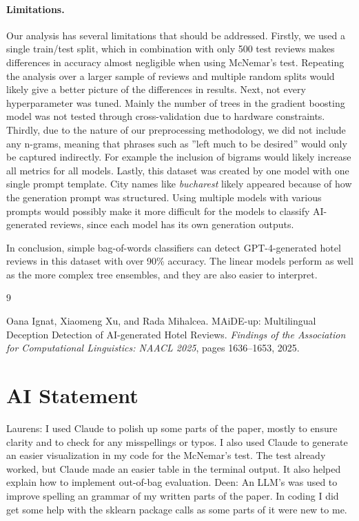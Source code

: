 \documentclass{article}
\begin{document}
\paragraph{Limitations.} 
Our analysis has several limitations that should be addressed. Firstly, we used a single train/test split, which in combination with only 500 test reviews makes differences in accuracy almost negligible when using McNemar's test. Repeating the analysis over a larger sample of reviews and multiple random splits would likely give a better picture of the differences in results. 
Next, not every hyperparameter was tuned. Mainly the number of trees in the gradient boosting model was not tested through cross-validation due to hardware constraints.  
Thirdly, due to the nature of our preprocessing methodology, we did not include any n-grams, meaning that phrases such as ''left much to be desired'' would only be captured indirectly. For example the inclusion of bigrams would likely increase all metrics for all models. 
Lastly, this dataset was created by one model with one single prompt template. City names like \emph{bucharest} likely appeared because of how the generation prompt was structured. Using multiple models with various prompts would possibly make it more difficult for the models to classify AI-generated reviews, since each model has its own generation outputs. 

In conclusion, simple bag-of-words classifiers can detect GPT-4-generated hotel
reviews in this dataset with over 90\% accuracy. The linear models perform as
well as the more complex tree ensembles, and they are also easier to interpret.

\begin{thebibliography}{9}

Oana Ignat, Xiaomeng Xu, and Rada Mihalcea.
\newblock MAiDE-up: Multilingual Deception Detection of AI-generated Hotel Reviews.
\newblock \textit{Findings of the Association for Computational Linguistics: NAACL 2025}, pages 1636--1653, 2025.


\end{thebibliography}

\section{AI Statement}

Laurens: 
I used Claude to polish up some parts of the paper, mostly to ensure clarity and to check for any misspellings or typos. I also used Claude to generate an easier visualization in my code for the McNemar's test. The test already worked, but Claude made an easier table in the terminal output. It also helped explain how to implement out-of-bag evaluation.
Deen: An LLM's was used to improve spelling an grammar of my written parts of the paper. In coding I did get some help with the sklearn package calls as some parts of it were new to me. 
\end{document}
